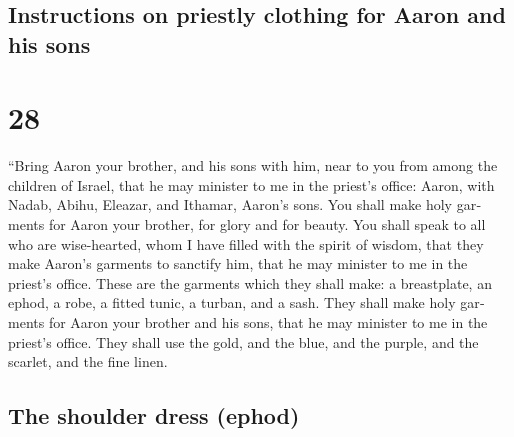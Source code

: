 \begin{paracol}{2}
\switchcolumn
\begin{otherlanguage}{english}

\hypertarget{instructions-on-priestly-clothing-for-aaron-and-his-sons}{%
\subsection{Instructions on priestly clothing for Aaron and his
sons}\label{instructions-on-priestly-clothing-for-aaron-and-his-sons}}

\hypertarget{section-55}{%
\section{28}\label{section-55}}

 ``Bring Aaron your brother, and his sons with him, near
to you from among the children of Israel, that he may minister to me in
the priest's office: Aaron, with Nadab, Abihu, Eleazar, and Ithamar,
Aaron's sons.  You shall make holy garments for Aaron your
brother, for glory and for beauty.  You shall speak to all
who are wise-hearted, whom I have filled with the spirit of wisdom, that
they make Aaron's garments to sanctify him, that he may minister to me
in the priest's office.  These are the garments which they
shall make: a breastplate, an ephod, a robe, a fitted tunic, a turban,
and a sash. They shall make holy garments for Aaron your brother and his
sons, that he may minister to me in the priest's office. 
They shall use the gold, and the blue, and the purple, and the scarlet,
and the fine linen.

\hypertarget{the-shoulder-dress-ephod}{%
\subsection{The shoulder dress (ephod)}\label{the-shoulder-dress-ephod}}


\end{otherlanguage}
\end{paracol}

